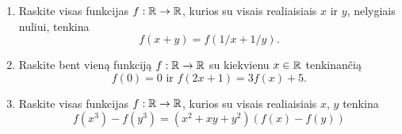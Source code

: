 \begin{enumerate}
  \item Raskite visas funkcijas $f:\mathbb R\to\mathbb R$, kurios su visais realiaisiais
    $x$ ir $y$, nelygiais nuliui, tenkina $$f(x+y)=f(1/x+1/y).$$
  \item \text{[Brazil 1993]} Raskite bent vieną funkciją $f:\mathbb R\to\mathbb R$ su kiekvienu $x \in \mathbb R$
    tenkinančią $$f(0)=0 \text{ ir } f(2x+1)=3f(x)+5.$$
  \item Raskite visas funkcijas $f:\mathbb R\to\mathbb R$, kurios su visais realiaisiais
    $x$, $y$ tenkina $$f(x^{3})-f(y^{3})=(x^{2}+xy+y^{2})(f(x)-f(y))$$

\end{enumerate}

